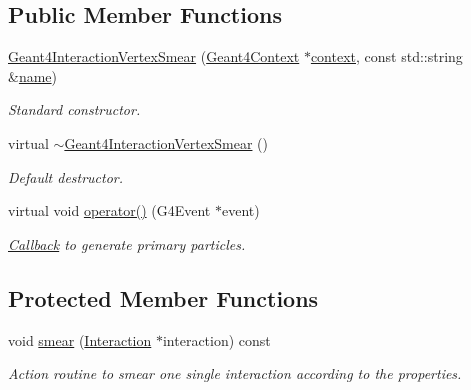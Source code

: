 \subsection*{Public Member Functions}
\begin{DoxyCompactItemize}
\item 
\hyperlink{class_d_d4hep_1_1_simulation_1_1_geant4_interaction_vertex_smear_ad9e83f372fc7dc142f60a709e863d605}{Geant4\+Interaction\+Vertex\+Smear} (\hyperlink{class_d_d4hep_1_1_simulation_1_1_geant4_context}{Geant4\+Context} $\ast$\hyperlink{class_d_d4hep_1_1_simulation_1_1_geant4_action_aa9d87f0ec2a72b7fc2591b18f98d75cf}{context}, const std\+::string \&\hyperlink{class_d_d4hep_1_1_simulation_1_1_geant4_action_af374e70b014d16afb81dd9d77cc3894b}{name})
\begin{DoxyCompactList}\small\item\em Standard constructor. \end{DoxyCompactList}\item 
virtual \hyperlink{class_d_d4hep_1_1_simulation_1_1_geant4_interaction_vertex_smear_aca69c6fbcb40dc0bcb6cd044906e5028}{$\sim$\+Geant4\+Interaction\+Vertex\+Smear} ()
\begin{DoxyCompactList}\small\item\em Default destructor. \end{DoxyCompactList}\item 
virtual void \hyperlink{class_d_d4hep_1_1_simulation_1_1_geant4_interaction_vertex_smear_ada2914ca2a761ff0e1ccbbcc8bef578e}{operator()} (G4\+Event $\ast$event)
\begin{DoxyCompactList}\small\item\em \hyperlink{class_d_d4hep_1_1_callback}{Callback} to generate primary particles. \end{DoxyCompactList}\end{DoxyCompactItemize}
\subsection*{Protected Member Functions}
\begin{DoxyCompactItemize}
\item 
void \hyperlink{class_d_d4hep_1_1_simulation_1_1_geant4_interaction_vertex_smear_af1ff8068afb57e4b3874d2073ddc0d07}{smear} (\hyperlink{class_d_d4hep_1_1_simulation_1_1_geant4_interaction_vertex_smear_ab70397967639759170996f67855a8c74}{Interaction} $\ast$interaction) const
\begin{DoxyCompactList}\small\item\em Action routine to smear one single interaction according to the properties. \end{DoxyCompactList}\end{DoxyCompactItemize}
